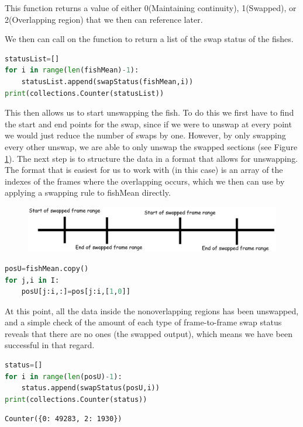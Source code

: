 \documentclass[12pt]{article}
\begin{document}
This function returns a value of  either 0(Maintaining continuity), 1(Swapped), or 2(Overlapping region) that we then can reference later.

We then can call on the function to return a list of the swap status of the fishes.

\begin{minipage}[c]{\textwidth}
\begin{lstlisting}[language=Python]
statusList=[]
for i in range(len(fishMean)-1):
    statusList.append(swapStatus(fishMean,i))
print(collections.Counter(statusList))
\end{lstlisting}
\end{minipage}

This then allows us to start unswapping the fish. To do this we first have to find the start and end points for the swap, since if we were to unswap at every point we would just reduce the number of swaps by one. However, by only swapping every other unswap, we are able to only unswap the swapped sections (see Figure \ref{fig:line_sketch}). The next step is to structure the data in a format that allows for unswapping. The format that is easiest for us to work with (in this case) is an array of the indexes of the frames where the overlapping occurs, which we then can use by applying a swapping rule to fishMean directly.
\begin{figure}[h] 
	\centering
	\includegraphics[width=.5\textwidth]{fish5}
	\caption{}
	\label{fig:line_sketch}
\end{figure}

\begin{minipage}[c]{\textwidth}
\begin{lstlisting}[language=Python]
posU=fishMean.copy()
for j,i in I:
    posU[j:i,:]=pos[j:i,[1,0]]
\end{lstlisting}
\end{minipage}

At this point, all the data inside the nonoverlapping regions has been unswapped, and a simple check of the amount of each type of frame-to-frame swap status reveals that there are no ones (the swapped output), which means we have been successful in that regard.

\begin{minipage}[c]{\textwidth}
\begin{lstlisting}[language=Python]
status=[]
for i in range(len(posU)-1):
    status.append(swapStatus(posU,i))
print(collections.Counter(status))
\end{lstlisting}
\end{minipage}
\begin{verbatim}
Counter({0: 49283, 2: 1930})
\end{verbatim}
\end{document}
